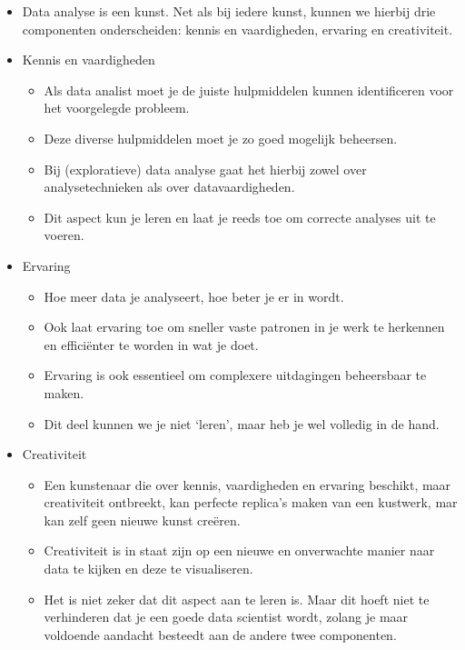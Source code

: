 \documentclass[]{tufte-book}
\providecommand{\tightlist}{%
  \setlength{\itemsep}{0pt}\setlength{\parskip}{0pt}}
\begin{document}
\begin{itemize}
\tightlist
\item
  Data analyse is een kunst. Net als bij iedere kunst, kunnen we hierbij drie componenten onderscheiden: kennis en vaardigheden, ervaring en creativiteit.
\item
  Kennis en vaardigheden

  \begin{itemize}
  \tightlist
  \item
    Als data analist moet je de juiste hulpmiddelen kunnen identificeren voor het voorgelegde probleem.
  \item
    Deze diverse hulpmiddelen moet je zo goed mogelijk beheersen.
  \item
    Bij (exploratieve) data analyse gaat het hierbij zowel over analysetechnieken als over datavaardigheden.
  \item
    Dit aspect kun je leren en laat je reeds toe om correcte analyses uit te voeren.
  \end{itemize}
\item
  Ervaring

  \begin{itemize}
  \tightlist
  \item
    Hoe meer data je analyseert, hoe beter je er in wordt.
  \item
    Ook laat ervaring toe om sneller vaste patronen in je werk te herkennen en efficiënter te worden in wat je doet.
  \item
    Ervaring is ook essentieel om complexere uitdagingen beheersbaar te maken.
  \item
    Dit deel kunnen we je niet `leren', maar heb je wel volledig in de hand.
  \end{itemize}
\item
  Creativiteit

  \begin{itemize}
  \tightlist
  \item
    Een kunstenaar die over kennis, vaardigheden en ervaring beschikt, maar creativiteit ontbreekt, kan perfecte replica's maken van een kustwerk, mar kan zelf geen nieuwe kunst creëren.
  \item
    Creativiteit is in staat zijn op een nieuwe en onverwachte manier naar data te kijken en deze te visualiseren.
  \item
    Het is niet zeker dat dit aspect aan te leren is. Maar dit hoeft niet te verhinderen dat je een goede data scientist wordt, zolang je maar voldoende aandacht besteedt aan de andere twee componenten.
  \end{itemize}
\end{itemize}
\end{document}
